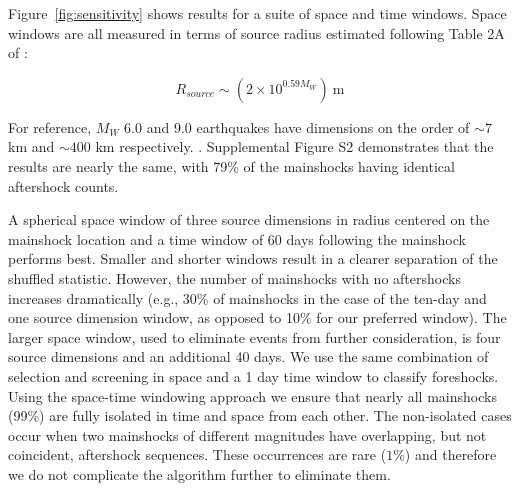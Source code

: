 \documentclass[draft, jgrga]{agujournal2018}
\begin{document}
Figure~\ref{fig:sensitivity} shows results for a suite of space and time windows. Space windows are all measured in terms of source radius estimated following Table 2A of \citet{Wells1994}:
%
\begin{linenomath*}
\begin{equation}\label{eq:wells}
    R_{source}\sim (2\times 10^{0.59M_W})\SI{}{\meter} 
\end{equation}
\end{linenomath*}
%
For reference, $M_W$ 6.0 and 9.0 earthquakes have dimensions on the order of $\sim 7$ km and $\sim 400$ km respectively.  \citet{Brengman2019EarthquakeScalingDistributions}. Supplemental Figure S2 demonstrates that the results are nearly the same, with 79\% of the mainshocks having identical aftershock counts. 

A spherical space window of three source dimensions in radius centered on the mainshock location and a time window of 60 days following the mainshock performs best. Smaller and shorter windows result in a clearer separation of the shuffled statistic. However, the number of mainshocks with no aftershocks increases dramatically (e.g., 30\% of mainshocks in the case of the ten-day and one source dimension window, as opposed to 10\% for our preferred window).  The larger space window, used to eliminate events from further consideration, is four source dimensions and an additional 40 days. We use the same combination of selection and screening in space and a 1 day time window to classify foreshocks. Using the space-time windowing approach we ensure that nearly all mainshocks (99\%) are fully isolated in time and space from each other. The non-isolated cases occur when two mainshocks of different magnitudes have overlapping, but not coincident, aftershock sequences. These occurrences are rare ($1\%$) and therefore we do not complicate the algorithm further to eliminate them. 
\end{document}
